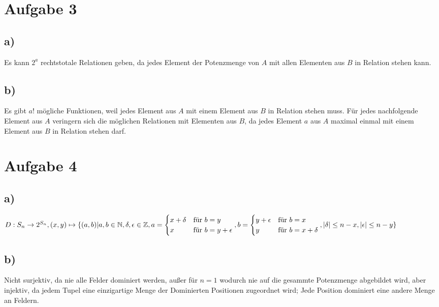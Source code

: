 \documentclass{article}
\begin{document}
\section*{Aufgabe 3}
\subsection*{a)}
Es kann $2^a$ rechtstotale Relationen geben, da jedes Element der Potenzmenge von $A$ mit allen Elementen aus $B$ in Relation stehen kann.

\subsection*{b)}
Es gibt $a!$ mögliche Funktionen, weil jedes Element aus $A$ mit einem Element aus $B$ in Relation stehen muss. Für jedes nachfolgende Element aus $A$ veringern sich die möglichen Relationen mit Elementen aus $B$, da jedes Element $a$ aus $A$ maximal einmal mit einem Element aus $B$ in Relation stehen darf.

\section*{Aufgabe 4}
\subsection*{a)}

$D: S_{n} \rightarrow 2^{S_{n}}, (x, y) \mapsto \{(a, b) | a, b \in \mathbb{N}, \delta, \epsilon \in \mathbb{Z}, \\
	a = 
	\begin{cases}
		x + \delta & \text{für }b = y \\
		x & \text{für }b = y + \epsilon
\end{cases}
, b = 
	\begin{cases}
		y + \epsilon & \text{für }b = x \\
		y & \text{für }b = x + \delta
\end{cases}
, \vert \delta \vert \leq n - x, \vert \epsilon \vert \leq n - y
\}$

\subsection*{b)}
Nicht surjektiv, da nie alle Felder dominiert werden, außer für $n = 1$ wodurch nie auf die gesammte Potenzmenge abgebildet wird, aber injektiv, da jedem Tupel eine einzigartige Menge der Dominierten Positionen zugeordnet wird; Jede Position dominiert eine andere Menge an Feldern.
\end{document}
